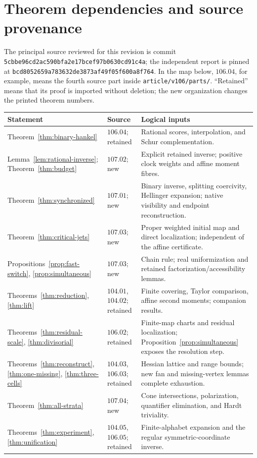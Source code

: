 \section{Theorem dependencies and source provenance}\label{app:dependencies}
The principal source reviewed for this revision is commit
\texttt{5cbbe96cd2ac590bfa2e17bcef97b0630cd91c4a};
the independent report is pinned at
\texttt{bcd8052659a783632de3873af49f05f600a8f764}.
In the map below, $106.04$, for example, means the fourth source part inside \texttt{article/v106/parts/}. ``Retained'' means that its proof is imported without deletion; the new organization changes the printed theorem numbers.

\begin{center}\small
\begin{tabular}{@{}p{}p{}p{}@{}}
\toprule
Statement & Source & Logical inputs \\
\midrule
Theorem~\ref{thm:binary-hankel} & $106.04$; retained & Rational scores, interpolation, and Schur complementation. \\
Lemma~\ref{lem:rational-inverse}; Theorem~\ref{thm:budget} & $107.02$; new & Explicit retained inverse; positive clock weights and affine moment fibres. \\
Theorem~\ref{thm:synchronized} & $107.01$; new & Binary inverse, splitting coercivity, Hellinger expansion; native visibility and endpoint reconstruction. \\
Theorem~\ref{thm:critical-jets} & $107.03$; new & Proper weighted initial map and direct localization; independent of the affine certificate. \\
Propositions~\ref{prop:fast-switch}, \ref{prop:simultaneous} & $107.03$; new & Chain rule; real uniformization and retained factorization/accessibility lemmas. \\
Theorems~\ref{thm:reduction}, \ref{thm:lift} & $104.01$, $104.02$; retained & Finite covering, Taylor comparison, affine second moments; companion results. \\
Theorems~\ref{thm:residual-scale}, \ref{thm:divisorial} & $106.02$; retained & Finite-map charts and residual localization; Proposition~\ref{prop:simultaneous} exposes the resolution step. \\
Theorems~\ref{thm:reconstruct}, \ref{thm:one-missing}, \ref{thm:three-cells} & $104.03$, $106.03$; retained & Hessian lattice and range bounds; new fan and missing-vertex lemmas complete exhaustion. \\
Theorem~\ref{thm:all-strata} & $107.04$; new & Cone intersections, polarization, quantifier elimination, and Hardt triviality. \\
Theorems~\ref{thm:experiment}, \ref{thm:unification} & $104.05$, $106.05$; retained & Finite-alphabet expansion and the regular symmetric-coordinate inverse. \\
\bottomrule
\end{tabular}
\end{center}

